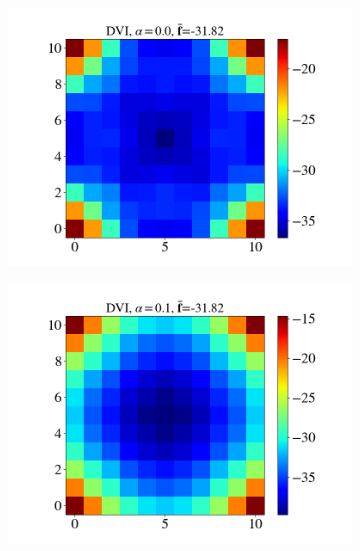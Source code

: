 \begin{itemize}
\begin{figure}[H]
\begin{subfigure}{0.32\columnwidth}
			\includegraphics[width=1.0\textwidth]{images/CD/Example7/10/N_11_DVI_0.0.png}
		\end{subfigure}
		\begin{subfigure}{0.32\columnwidth}	
			\centering
			\includegraphics[width=1.0\textwidth]{images/CD/Example7/10/N_11_DVI_0.1.png}
		\end{subfigure}
		\begin{subfigure}{0.32\columnwidth}	
			\centering

\end{subfigure}
\end{figure}
\end{itemize}
